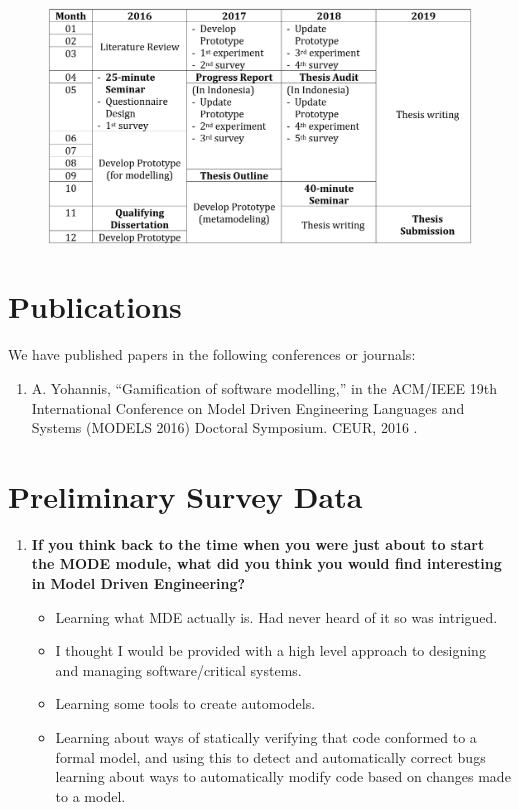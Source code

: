\documentclass[12pt, a4paper]{report}
\begin{document}
{\begin{appendices}
\begin {table}[ht]
\caption {Research Timetable} 
\end{table}
\begin{figure}[ht]
\centering
\includegraphics[width=\textwidth]{timetable}
\end{figure}

\chapter{Publications}
We have published papers in the following conferences or journals: 
\begin{enumerate}
 \item A. Yohannis, ``Gamiﬁcation of software modelling,” in the ACM/IEEE 19th International Conference on Model Driven Engineering Languages and Systems (MODELS 2016) Doctoral Symposium. CEUR, 2016 \cite{Yohannis2016}.
\end{enumerate}

\chapter{Preliminary Survey Data}
\label{chap:Preliminary Survey Data}

\begin{enumerate}
\item \textbf{If you think back to the time when you were just about to start the MODE module, what did you think you would find interesting in Model ­Driven Engineering?}
\begin{itemize}
\item Learning what MDE actually is. Had never heard of it so was intrigued.
\item I thought I would be provided with a high level approach to designing and managing software/critical systems.
\item Learning some tools to create auto­models.
\item Learning about ways of statically verifying that code conformed to a formal model, and using this to detect and automatically correct bugs learning about ways to automatically modify code based on changes made to a model.
\end{itemize}


\end{enumerate}
\end{appendices}}
\end{document}
